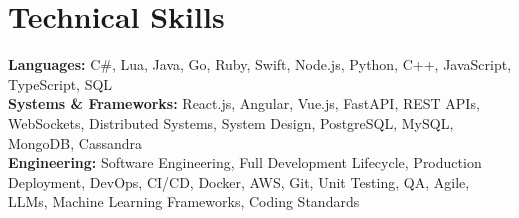 \documentclass[letterpaper,11pt]{article}
\begin{document}
\section{Technical Skills}
\begin{itemize}[leftmargin=0.15in, label={}]
  \small{\item{
    \textbf{Languages:} C\#, Lua, Java, Go, Ruby, Swift, Node.js, Python, C++, JavaScript, TypeScript, SQL \\
    \textbf{Systems \& Frameworks:} React.js, Angular, Vue.js, FastAPI, REST APIs, WebSockets, Distributed Systems, System Design, PostgreSQL, MySQL, MongoDB, Cassandra \\
    \textbf{Engineering:} Software Engineering, Full Development Lifecycle, Production Deployment, DevOps, CI/CD, Docker, AWS, Git, Unit Testing, QA, Agile, LLMs, Machine Learning Frameworks, Coding Standards
  }}
\end{itemize}
\end{document}
